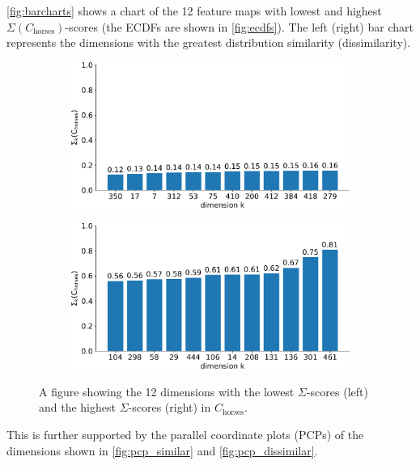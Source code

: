 \autoref{fig:barcharts} shows a chart of the 12 feature maps with lowest and highest $\Sigma(C_{\text{horses}})$-scores (the ECDFs are shown in \autoref{fig:ecdfs}). The left (right) bar chart represents the dimensions with the greatest distribution similarity (dissimilarity).
\begin{figure}[t]
    \centering
    \begin{subfigure}{.49\textwidth}
        \centering
        \includegraphics[width=\linewidth]{figures/lowest_scores_barchart_ds15.pdf}
    \end{subfigure}
    \hfill
    \begin{subfigure}{.49\textwidth}
        \centering
        \includegraphics[width=\linewidth]{figures/highest_scores_barchart_ds15.pdf}
    \end{subfigure}
    \caption{A figure showing the 12 dimensions with the lowest $\Sigma$-scores (left) and the highest $\Sigma$-scores (right) in $C_{\text{horses}}$.}
    \label{fig:barcharts}
\end{figure}
This is further supported by the parallel coordinate plots (PCPs) of the dimensions shown in \autoref{fig:pcp_similar} and \autoref{fig:pcp_dissimilar}. 

